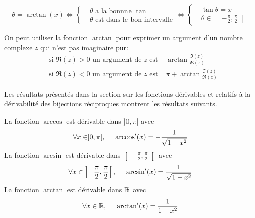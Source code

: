 \begin{displaymath}
 \theta = \arctan(x)\Leftrightarrow
\left\lbrace 
\begin{aligned}
 &\theta \text{ a la bonnne } \tan \\ &\theta \text{ est dans le bon intervalle}
\end{aligned}
\right. 
\Leftrightarrow
\left\lbrace 
\begin{aligned}
 &\tan \theta = x \\ &\theta \in \left] -\frac{\pi}{2},\frac{\pi}{2}\right[ 
\end{aligned}
\right. 
\end{displaymath}
\begin{rem}
  On peut utiliser la fonction $\arctan$ pour exprimer un argument d'un nombre complexe $z$ qui n'est pas imaginaire pur:
\begin{align*}
  &\text{si } \Re(z)>0 \text{ un argument de $z$ est } &\arctan\frac{\Im(z)}{\Re(z)} \\
  &\text{si } \Re(z)<0 \text{ un argument de $z$ est } &\pi + \arctan\frac{\Im(z)}{\Re(z)} 
\end{align*}
\end{rem}


Les résultats présentés dans la section sur les fonctions dérivables et relatifs à la dérivabilité des bijections réciproques montrent les résultats suivants.
\begin{prop}
 La fonction $\arccos$ est dérivable dans $]0,\pi[$ avec
\begin{displaymath}
 \forall x \in ]0,\pi[,\hspace{0.5cm}
\arccos'(x) = -\frac{1}{\sqrt{1-x^2}}
\end{displaymath}
La fonction $\arcsin$ est dérivable dans $\left] -\frac{\pi}{2}, \frac{\pi}{2}\right[$ avec
\begin{displaymath}
 \forall x \in \left] -\frac{\pi}{2}, \frac{\pi}{2}\right[,\hspace{0.5cm}
\arcsin'(x) = \frac{1}{\sqrt{1-x^2}}
\end{displaymath}
La fonction $\arctan$ est dérivable dans $\mathbb{R}$ avec
\begin{displaymath}
 \forall x \in \mathbb{R},\hspace{0.5cm}
\arctan'(x) = \frac{1}{1+x^2}
\end{displaymath}
\end{prop}

